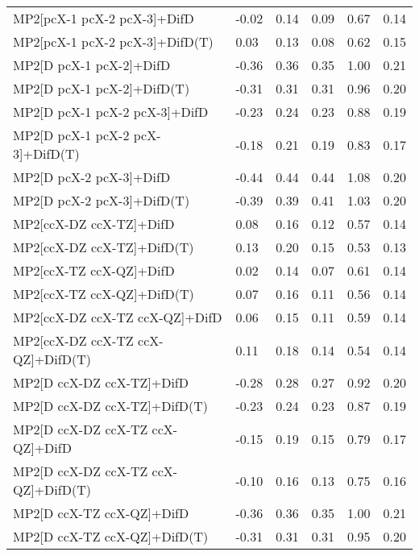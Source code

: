 \begin{table}
\begin{tabular}{l l l l l l }
    MP2[pcX-1 pcX-2 pcX-3]+DifD & -0.02 & 0.14 & 0.09 & 0.67 & 0.14 \\ 
    MP2[pcX-1 pcX-2 pcX-3]+DifD(T) & 0.03 & 0.13 & 0.08 & 0.62 & 0.15 \\ 
    MP2[D pcX-1 pcX-2]+DifD & -0.36 & 0.36 & 0.35 & 1.00 & 0.21 \\ 
    MP2[D pcX-1 pcX-2]+DifD(T) & -0.31 & 0.31 & 0.31 & 0.96 & 0.20 \\ 
    MP2[D pcX-1 pcX-2 pcX-3]+DifD & -0.23 & 0.24 & 0.23 & 0.88 & 0.19 \\ 
    MP2[D pcX-1 pcX-2 pcX-3]+DifD(T) & -0.18 & 0.21 & 0.19 & 0.83 & 0.17 \\ 
    MP2[D pcX-2 pcX-3]+DifD & -0.44 & 0.44 & 0.44 & 1.08 & 0.20 \\ 
    MP2[D pcX-2 pcX-3]+DifD(T) & -0.39 & 0.39 & 0.41 & 1.03 & 0.20 \\ 
    MP2[ccX-DZ ccX-TZ]+DifD & 0.08 & 0.16 & 0.12 & 0.57 & 0.14 \\ 
    MP2[ccX-DZ ccX-TZ]+DifD(T) & 0.13 & 0.20 & 0.15 & 0.53 & 0.13 \\ 
    MP2[ccX-TZ ccX-QZ]+DifD & 0.02 & 0.14 & 0.07 & 0.61 & 0.14 \\ 
    MP2[ccX-TZ ccX-QZ]+DifD(T) & 0.07 & 0.16 & 0.11 & 0.56 & 0.14 \\ 
    MP2[ccX-DZ ccX-TZ ccX-QZ]+DifD & 0.06 & 0.15 & 0.11 & 0.59 & 0.14 \\ 
    MP2[ccX-DZ ccX-TZ ccX-QZ]+DifD(T) & 0.11 & 0.18 & 0.14 & 0.54 & 0.14 \\ 
    MP2[D ccX-DZ ccX-TZ]+DifD & -0.28 & 0.28 & 0.27 & 0.92 & 0.20 \\ 
    MP2[D ccX-DZ ccX-TZ]+DifD(T) & -0.23 & 0.24 & 0.23 & 0.87 & 0.19 \\ 
    MP2[D ccX-DZ ccX-TZ ccX-QZ]+DifD & -0.15 & 0.19 & 0.15 & 0.79 & 0.17 \\ 
    MP2[D ccX-DZ ccX-TZ ccX-QZ]+DifD(T) & -0.10 & 0.16 & 0.13 & 0.75 & 0.16 \\ 
    MP2[D ccX-TZ ccX-QZ]+DifD & -0.36 & 0.36 & 0.35 & 1.00 & 0.21 \\ 
    MP2[D ccX-TZ ccX-QZ]+DifD(T) & -0.31 & 0.31 & 0.31 & 0.95 & 0.20 \\ 
    \bottomrule
  \end{tabular}
\end{table}

